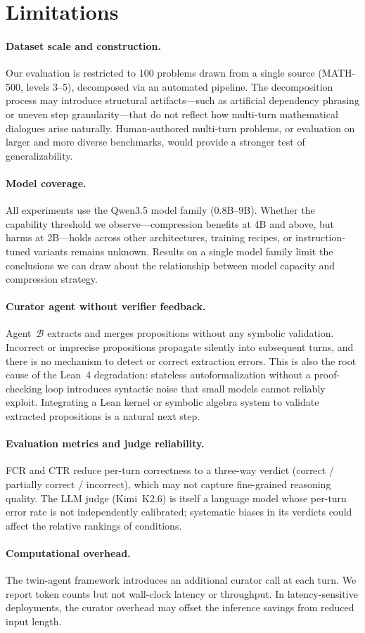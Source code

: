 \section*{Limitations}

\paragraph{Dataset scale and construction.}
Our evaluation is restricted to 100 problems drawn from a single source (MATH-500, levels 3--5), decomposed via an automated pipeline. The decomposition process may introduce structural artifacts---such as artificial dependency phrasing or uneven step granularity---that do not reflect how multi-turn mathematical dialogues arise naturally. Human-authored multi-turn problems, or evaluation on larger and more diverse benchmarks, would provide a stronger test of generalizability.

\paragraph{Model coverage.}
All experiments use the Qwen3.5 model family (0.8B--9B). Whether the capability threshold we observe---compression benefits at 4B and above, but harms at 2B---holds across other architectures, training recipes, or instruction-tuned variants remains unknown. Results on a single model family limit the conclusions we can draw about the relationship between model capacity and compression strategy.

\paragraph{Curator agent without verifier feedback.}
Agent~$\mathcal{B}$ extracts and merges propositions without any symbolic validation. Incorrect or imprecise propositions propagate silently into subsequent turns, and there is no mechanism to detect or correct extraction errors. This is also the root cause of the Lean~4 degradation: stateless autoformalization without a proof-checking loop introduces syntactic noise that small models cannot reliably exploit. Integrating a Lean kernel or symbolic algebra system to validate extracted propositions is a natural next step.

\paragraph{Evaluation metrics and judge reliability.}
FCR and CTR reduce per-turn correctness to a three-way verdict (correct / partially correct / incorrect), which may not capture fine-grained reasoning quality. The LLM judge (Kimi~K2.6) is itself a language model whose per-turn error rate is not independently calibrated; systematic biases in its verdicts could affect the relative rankings of conditions.

\paragraph{Computational overhead.}
The twin-agent framework introduces an additional curator call at each turn. We report token counts but not wall-clock latency or throughput. In latency-sensitive deployments, the curator overhead may offset the inference savings from reduced input length.

